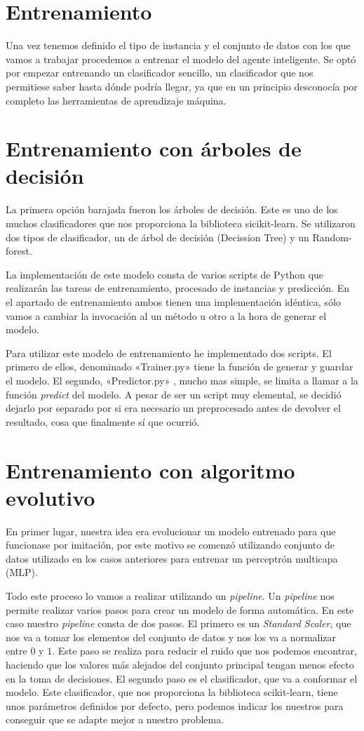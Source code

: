 \section{Entrenamiento}
Una vez tenemos definido el tipo de instancia y el conjunto de datos con los que vamos a trabajar procedemos a entrenar el modelo del agente inteligente. Se optó por empezar entrenando un clasificador sencillo, un clasificador que nos permitiese saber hasta dónde podría llegar, ya que en un principio desconocía por completo las herramientas de aprendizaje máquina.

\section{Entrenamiento con árboles de decisión}

La primera opción barajada fueron los árboles de decisión. Este es uno de los muchos clasificadores que nos proporciona la biblioteca sicikit-learn. Se utilizaron dos tipos de clasificador, un de árbol de decisión (Decission Tree) y un Random-forest. 

 La implementación de este modelo consta de varios scripts de Python que realizarán las tareas de entrenamiento, procesado de instancias y predicción. En el apartado de entrenamiento ambos tienen una implementación idéntica, sólo vamos a cambiar la invocación al un método u otro a la hora de generar el modelo.
 
 
 Para utilizar este modelo de entrenamiento he implementado dos scripts. El primero de ellos, denominado «Trainer.py» tiene la función de generar y guardar el modelo. El segundo, «Predictor.py» , mucho mas simple, se limita a llamar a la función \emph{predict} del modelo. A pesar de ser un script muy elemental, se decidió dejarlo por separado por si era necesario un preprocesado antes de devolver el resultado, cosa que finalmente sí que ocurrió. 
 

\section{Entrenamiento con algoritmo evolutivo}

En primer lugar, nuestra idea era evolucionar un modelo entrenado para que funcionase por imitación, por este motivo se comenzó utilizando conjunto de datos utilizado en los casos anteriores para entrenar un perceptrón multicapa (MLP). 

Todo este proceso lo vamos a realizar utilizando un \emph{pipeline}. Un \emph{pipeline} nos permite realizar varios pasos para crear un modelo de forma automática. En este caso nuestro \emph{pipeline} consta de dos pasos. El primero es un \emph{Standard Scaler}, que nos va a tomar los elementos del conjunto de datos y nos los va a normalizar entre $0$ y $1$. Este paso se realiza para reducir el ruido que nos podemos encontrar, haciendo que los valores más alejados del conjunto principal tengan menos efecto en la toma de decisiones. El segundo paso es el clasificador, que va a conformar el modelo. Este clasificador, que nos proporciona la biblioteca scikit-learn, tiene unos parámetros definidos por defecto, pero podemos indicar los nuestros para conseguir que se adapte mejor a nuestro problema.

